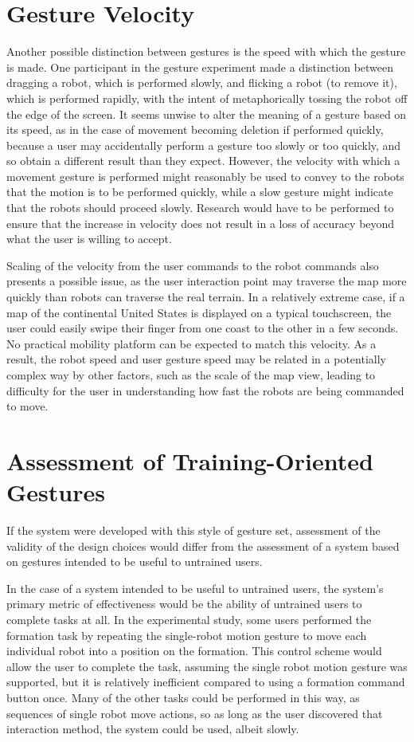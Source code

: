 \section{Gesture Velocity}

Another possible distinction between gestures is the speed with which the gesture is made. 
One participant in the gesture experiment made a distinction between dragging a robot, which is performed slowly, and flicking a robot (to remove it), which is performed rapidly, with the intent of metaphorically tossing the robot off the edge of the screen. 
It seems unwise to alter the meaning of a gesture based on its speed, as in the case of movement becoming deletion if performed quickly, because a user may accidentally perform a gesture too slowly or too quickly, and so obtain a different result than they expect. 
However, the velocity with which a movement gesture is performed might reasonably be used to convey to the robots that the motion is to be performed quickly, while a slow gesture might indicate that the robots should proceed slowly.
Research would have to be performed to ensure that the increase in velocity does not result in a loss of accuracy beyond what the user is willing to accept.
  
Scaling of the velocity from the user commands to the robot commands also presents a possible issue, as the user interaction point may traverse the map more quickly than robots can traverse the real terrain. 
In a relatively extreme case, if a map of the continental United States is displayed on a typical touchscreen, the user could easily swipe their finger from one coast to the other in a few seconds. 
No practical mobility platform can be expected to match this velocity. 
As a result, the robot speed and user gesture speed may be related in a potentially complex way by other factors, such as the scale of the map view, leading to difficulty for the user in understanding how fast the robots are being commanded to move. 

\section{Assessment of Training-Oriented Gestures}

If the system were developed with this style of gesture set, assessment of the validity of the design choices would differ from the assessment of a system based on gestures intended to be useful to untrained users. 

In the case of a system intended to be useful to untrained users, the system's primary metric of effectiveness would be the ability of untrained users to complete tasks at all. 
In the experimental study, some users performed the formation task by repeating the single-robot motion gesture to move each individual robot into a position on the formation. 
This control scheme would allow the user to complete the task, assuming the single robot motion gesture was supported, but it is relatively inefficient compared to using a formation command button once. 
Many of the other tasks could be performed in this way, as sequences of single robot move actions, so as long as the user discovered that interaction method, the system could be used, albeit slowly. 

